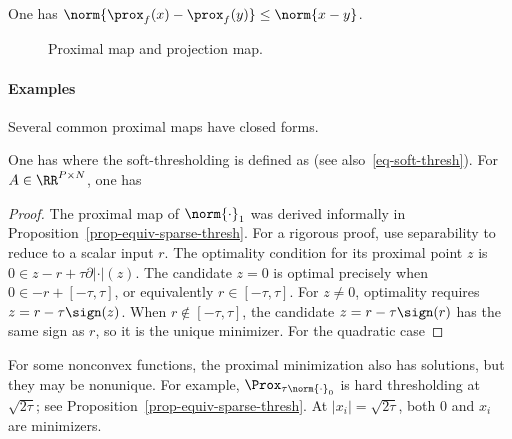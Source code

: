 \begin{prop}
	One has $\norm{ \prox_{f}(x)-\prox_{f}(y) } \leq \norm{x-y}$.
\end{prop}



\begin{figure}[tbp]
\centering
{}
\caption{Proximal map and projection map.}
\label{fig-prox-proj}
\end{figure}


\paragraph{Examples}

Several common proximal maps have closed forms.

\begin{prop}
One has
where the soft-thresholding is defined as
(see also~\eqref{eq-soft-thresh}). For $A \in \RR^{P \times N}$, one has
\end{prop}
\begin{proof}
	The proximal map of $\norm{\cdot}_1$ was derived informally in Proposition~\ref{prop-equiv-sparse-thresh}.
	For a rigorous proof, use separability to reduce to a scalar input $r$. The optimality condition for its proximal point $z$ is $0 \in z-r + \tau \partial |\cdot|(z)$.
	The candidate $z=0$ is optimal precisely when $0 \in -r + [-\tau,\tau]$, or equivalently $r \in [-\tau,\tau]$.
	For $z \neq 0$, optimality requires $z = r - \tau \sign(z)$. When $r \notin [-\tau,\tau]$,
	the candidate $z = r - \tau \sign(r)$ has the same sign as $r$, so it is the unique minimizer.
	For the quadratic case
\end{proof}


For some nonconvex functions, the proximal minimization also has solutions, but they may be nonunique. For example,
$\Prox_{\tau \norm{\cdot}_0}$ is hard thresholding at $\sqrt{2\tau}$; see Proposition~\ref{prop-equiv-sparse-thresh}. At $|x_i|=\sqrt{2\tau}$, both $0$ and $x_i$ are minimizers.


